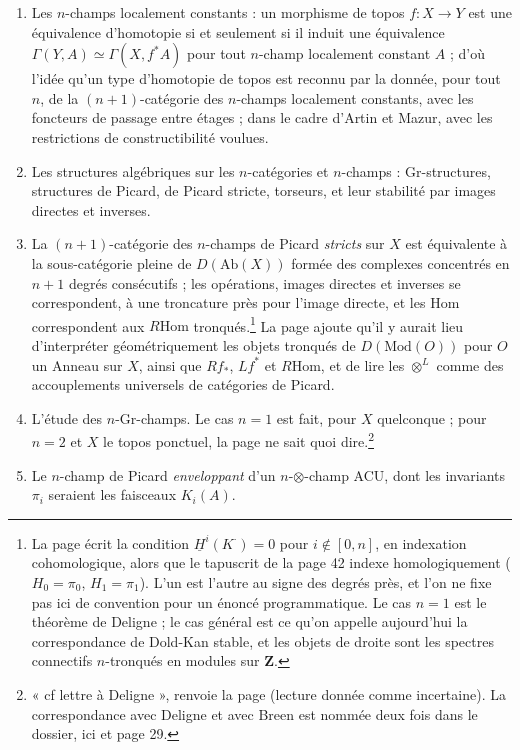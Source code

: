 \documentclass[11pt,a4paper]{article}
\begin{document}
\begin{enumerate}
\item Les $n$-champs localement constants : un morphisme de topos $f : X
\to Y$ est une équivalence d'homotopie si et seulement si il induit une
équivalence $\Gamma(Y,A) \simeq \Gamma(X, f^{*}A)$ pour tout $n$-champ
localement constant $A$ ; d'où l'idée qu'un type d'homotopie de topos est
reconnu par la donnée, pour tout $n$, de la $(n{+}1)$-catégorie des
$n$-champs localement constants, avec les foncteurs de passage entre étages ;
dans le cadre d'Artin et Mazur, avec les restrictions de constructibilité
voulues.
\item Les structures algébriques sur les $n$-catégories et $n$-champs :
Gr-structures, structures de Picard, de Picard stricte, torseurs, et leur
stabilité par images directes et inverses.
\item La $(n{+}1)$-catégorie des $n$-champs de Picard \emph{stricts} sur
$X$ est équivalente à la sous-catégorie pleine de $D(\mathrm{Ab}(X))$ formée
des complexes concentrés en $n{+}1$ degrés consécutifs ; les opérations,
images directes et inverses se correspondent, à une troncature près pour
l'image directe, et les $\mathrm{Hom}$ correspondent aux $R\mathrm{Hom}$
tronqués.\footnote{La page écrit la condition $\underline{H}^{i}(K^{\cdot}) =
0$ pour $i \notin [0,n]$, en indexation cohomologique, alors que le tapuscrit
de la page 42 indexe homologiquement ($H_{0} = \pi_{0}$, $H_{1} = \pi_{1}$).
L'un est l'autre au signe des degrés près, et l'on ne fixe pas ici de
convention pour un énoncé programmatique. Le cas $n = 1$ est le théorème de
Deligne ; le cas général est ce qu'on appelle aujourd'hui la correspondance de
Dold-Kan stable, et les objets de droite sont les spectres connectifs
$n$-tronqués en modules sur $\mathbf{Z}$.} La page ajoute qu'il y aurait lieu
d'interpréter géométriquement les objets tronqués de $D(\mathrm{Mod}(O))$ pour
$O$ un Anneau sur $X$, ainsi que $Rf_{*}$, $Lf^{*}$ et $R\mathrm{Hom}$, et de
lire les $\otimes^{L}$ comme des accouplements universels de catégories de
Picard.
\item L'étude des $n$-Gr-champs. Le cas $n = 1$ est fait, pour $X$
quelconque ; pour $n = 2$ et $X$ le topos ponctuel, la page ne sait quoi
dire.\footnote{« cf lettre à Deligne », renvoie la page (lecture donnée
comme incertaine). La correspondance avec Deligne et avec Breen est nommée deux fois
dans le dossier, ici et page 29.}
\item Le $n$-champ de Picard \emph{enveloppant} d'un $n$-$\otimes$-champ
ACU, dont les invariants $\pi_{i}$ seraient les faisceaux $K_{i}(A)$.
\end{enumerate}
\end{document}
